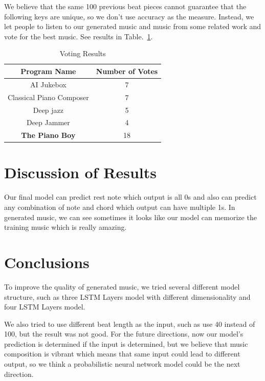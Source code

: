 \documentclass[conference]{IEEEtran}
\begin{document}
We believe that the same 100 previous beat pieces cannot guarantee that the following keys are unique, so we don't use accuracy as the measure. Instead, we let people to listen to our generated music and music from some related work and vote for the best music. See results in Table.~\ref{tab1}.

\begin{table}[htbp]
\caption{Voting Results}
\begin{center}
\begin{tabular}{|c|c|}
\hline
Program Name& Number of Votes\\
\hline
AI Jukebox& 7\\
Classical Piano Composer& 7\\
Deep jazz& 5\\
Deep Jammer& 4\\
\textbf{The Piano Boy}& 18\\
\hline
\end{tabular}
\label{tab1}
\end{center}
\end{table}

\section{Discussion of Results}
Our final model can predict rest note which output is all 0s and also can predict any combination of note and chord which output can have multiple 1s. In generated music, we can see sometimes it looks like our model can memorize the training music which is really amazing.

\section{Conclusions}
To improve the quality of generated music, we tried several different model structure, such as three LSTM Layers model with different dimensionality and four LSTM Layers model.

We also tried to use different beat length as the input, such as use 40 instead of 100, but the result was not good.						
For the future directions, now our model's prediction is determined if the input is determined, but we believe that music composition is vibrant which means that same input could lead to different output, so we think a probabilistic neural network model could be the next direction.
\end{document}
